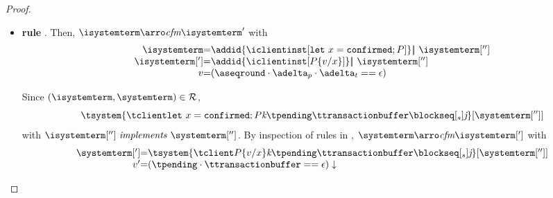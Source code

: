 \begin{proof}
\begin{itemize}
\begin{itemize}
\begin{enumerate}
						Then, we can build the following proof for 
						$\rvalue{r}{\flatten {\queuemessage[0..\tknown-1] \cdot \tpending} \cdot \ttransactionbuffer}
						= 
						\iapply{\known}{{\igetdeltas\pending}\cdot{\pushbuffer}\cdot{\transactionbuffer}}$
						\[
						  \mathrulean{\triangread}
						    {
								  \mathrulean{\lemref{lemma:apply}}
									{
										\mathrulean{\triangapply}
										{
										\known \triangleleft \flatten {\queuemessage[0..\tknown-1]}
										\quad 
										\mathrulean{\lemref{lemma:reduce}}
											{
												\ireduce{\igetdeltas{\pending}\cdot{\pushbuffer}} \triangleleft \flatten{\tpending}
												\quad
												\transactionbuffer \triangleleft \ttransactionbuffer
											}
											{\ireduce{{\igetdeltas\pending}\cdot{\pushbuffer}\cdot{\transactionbuffer}} 
											\triangleleft {\flatten {\tpending} \cdot \ttransactionbuffer}}
										}
										{\iapply{\known}{\ireduce{{\igetdeltas\pending}\cdot{\pushbuffer}\cdot{\transactionbuffer}}}
									\triangleleft {\flatten {\queuemessage[0..\tknown-1] \cdot \tpending} \cdot \ttransactionbuffer}}
									}
									{\iapply{\known}{{\igetdeltas\pending}\cdot{\pushbuffer}\cdot{\transactionbuffer}}  
									\triangleleft {\flatten {\queuemessage[0..\tknown-1] \cdot \tpending} \cdot \ttransactionbuffer}}
								}
  						  {v'  = v}  
					\]
											
						\item[{--}] The remaining properties straightforwardly hold.
						

					\end{enumerate}

\item {\bf rule }. Then, $\isystemterm  \arroi{\confirmedtran} \isystemterm '$ with 
				\[\begin{array}{r@{=}l}
					\isystemterm & \addid{\iclientinst[\tconfirmedins{x}]} \bigpar \ \isystemterm['']
					\\
					\isystemterm['] & \addid{\iclientinst[P\subst{x}{v}]} \bigpar \ \isystemterm['']	
					\\
					v & (\pending  \cdot \pushbuffer \cdot\transactionbuffer == \epsilon) 
				  \end{array}
				\]
		
		
				Since $(\isystemterm,\systemterm)\in \mathcal{R}$,
				\[\tsystem{\tclienti{\tconfirmedins{x}}{\tknown}{\tpending}{\ttransactionbuffer}{\tsent}{\treceivebuffer}}[{\systemterm['']}]\]
				with $\implements{\isystemterm['']}{\systemterm['']}$. By inspection of rules in \figref{}, 
				$\systemterm \arroi{\confirmedtran} \isystemterm[']$ with
				\[\begin{array}{r@{=}l}
					\systemterm['] & \tsystem{\tclienti{{\tprogram}\subst{x}{v}}
		{\tknown}{\tpending}{\ttransactionbuffer}{\tsent}{\treceivebuffer}}[{\systemterm['']}]	\\
					v' & \eval{(\tpending \cdot  \ttransactionbuffer == \epsilon)}
				  \end{array}		
				\]
				

\end{itemize}
\end{itemize}
\end{proof}
